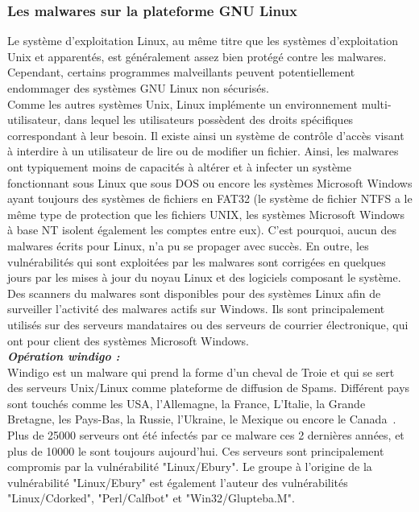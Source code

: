 \subsubsection{Les malwares sur la plateforme GNU Linux}    


Le système d'exploitation Linux, au même titre que les systèmes d'exploitation Unix et apparentés, est généralement assez bien protégé contre les malwares. Cependant, certains programmes malveillants peuvent potentiellement endommager des systèmes GNU Linux non sécurisés.\\


Comme les autres systèmes Unix, Linux implémente un environnement multi-utilisateur, dans lequel les utilisateurs possèdent des droits spécifiques correspondant à leur besoin. Il existe ainsi un système de contrôle d'accès visant à interdire à un utilisateur de lire ou de modifier un fichier. Ainsi, les malwares ont typiquement moins de capacités à altérer et à infecter un système fonctionnant sous Linux que sous DOS ou encore les systèmes Microsoft Windows ayant toujours des systèmes de fichiers en FAT32 (le système de fichier NTFS a le même type de protection que les fichiers UNIX, les systèmes Microsoft Windows à base NT isolent également les comptes entre eux). C'est pourquoi, aucun des malwares écrits pour Linux, n'a pu se propager avec succès. En outre, les vulnérabilités qui sont exploitées par les malwares sont corrigées en quelques jours par les mises à jour du noyau Linux et des logiciels composant le système.\\


Des scanners du malwares sont disponibles pour des systèmes Linux afin de surveiller l'activité des malwares actifs sur Windows. Ils sont principalement utilisés sur des serveurs mandataires ou des serveurs de courrier électronique, qui ont pour client des systèmes Microsoft Windows.\\
\newpage
\textbf{\textit{Opération windigo :}}\\


Windigo est un malware qui prend la forme d’un cheval de Troie et qui se sert des serveurs Unix/Linux comme plateforme de diffusion de Spams. Différent pays sont touchés comme les USA, l'Allemagne, la France, L'Italie, la Grande Bretagne, les Pays-Bas, la Russie, l'Ukraine, le Mexique ou encore le Canada~\cite{windigo}.\\

Plus de 25000 serveurs ont été infectés par ce malware ces 2 dernières années, et plus de 10000 le sont toujours aujourd'hui. Ces serveurs sont principalement compromis par la vulnérabilité "Linux/Ebury". Le groupe à l'origine de la vulnérabilité "Linux/Ebury" est également l'auteur des vulnérabilités "Linux/Cdorked", "Perl/Calfbot" et "Win32/Glupteba.M".\\ 


